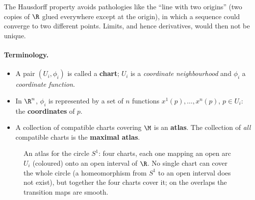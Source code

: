 \begin{remarkbox}
The Hausdorff property avoids pathologies like the ``line with two origins'' (two copies of $\R$ glued everywhere except at the origin), in which a sequence could converge to two different points. Limits, and hence derivatives, would then not be unique.
\end{remarkbox}

\paragraph{Terminology.}
\begin{itemize}[nosep]
  \item A pair $(U_i,\phi_i)$ is called a \textbf{chart}; $U_i$ is a \emph{coordinate neighbourhood} and $\phi_i$ a \emph{coordinate function}.
  \item In $\R^n$, $\phi_i$ is represented by a set of $n$ functions $x^1(p),\dots,x^n(p)$, $p\in U_i$: the \textbf{coordinates} of $p$.
  \item A collection of compatible charts covering $\M$ is an \textbf{atlas}. The collection of \emph{all} compatible charts is the \textbf{maximal atlas}.
\end{itemize}

\begin{figure}[ht]
\centering
{}
\caption{An atlas for the circle $S^1$: four charts, each one mapping an open arc $U_i$ (coloured) onto an open interval of $\R$. No single chart can cover the whole circle (a homeomorphism from $S^1$ to an open interval does not exist), but together the four charts cover it; on the overlaps the transition maps are smooth.}
\label{fig:atlas}
\end{figure}

